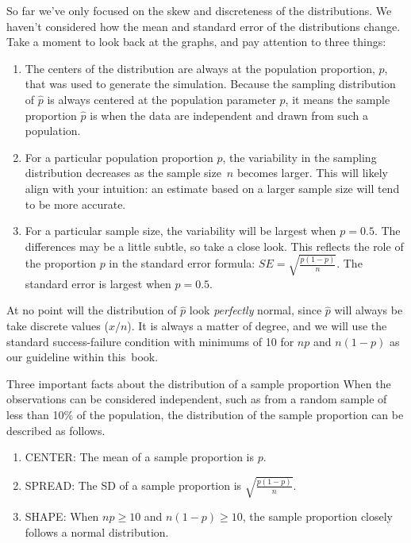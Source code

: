 \noindent So far we've only focused on the skew and discreteness
of the distributions.
We haven't considered how the mean and standard error
of the distributions change.
Take a moment to look back at the graphs,
and pay attention to three things:
\begin{enumerate}
\item The centers of the distribution are always at
    the population proportion, $p$, that was used to
    generate the simulation. Because the sampling
    distribution of $\hat{p}$ is always centered at
    the population parameter $p$, it means the sample
    proportion $\hat{p}$ is  when
    the data are independent and drawn from such
    a population.
\item For a particular population proportion $p$,
    the variability in the sampling distribution
    decreases as the sample size~$n$ becomes larger.
    This will likely align with your intuition:
    an estimate based on a larger sample size will
    tend to be more accurate.
\item For a particular sample size, the variability
    will be largest when $p = 0.5$. The differences
    may be a little subtle, so take a close look.
    This reflects the role of the proportion
    $p$ in the standard error formula:
    $SE = \sqrt{\frac{p (1 - p)}{n}}$.
    The standard error is largest when $p = 0.5$.
\end{enumerate}

At no point will the distribution of $\hat{p}$ look
\emph{perfectly} normal, since $\hat{p}$ will always
be take discrete values ($x / n$).
It is always a matter of degree, and we will use
the standard success-failure condition with minimums
of 10 for $np$ and $n (1 - p)$ as our guideline
within this~book.

\begin{onebox}{Three important facts about the distribution of a sample proportion }
When the observations can be considered independent, such as from a random sample of less than 10\% of the population, the distribution of the sample proportion can be described as follows.\begin{enumerate}
\setlength{\itemsep}{0mm}
\item CENTER:  The mean of a sample proportion is $p$.
\item SPREAD:  The SD of a sample proportion is $\sqrt{\frac{p(1-p)}{n}}$.
\item SHAPE:  When $np \geq 10$ and $n(1-p) \geq 10$, the sample proportion closely follows a normal distribution. 
\end{enumerate}\end{onebox}


